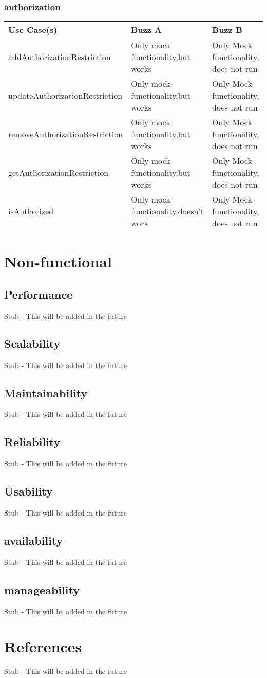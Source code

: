 \documentclass[12pt]{article}
\begin{document}
\subsubsection{authorization}%
\begin{tabular}{|l|l|l|}

\hline
Use Case(s) & Buzz A & Buzz B \\ 
\hline
addAuthorizationRestriction & Only mock functionality,but works & Only Mock functionality, does not run\\ %
\hline
updateAuthorizationRestriction & Only mock functionality,but works & Only Mock functionality, does not run\\ %
\hline
removeAuthorizationRestriction & Only mock functionality,but works & Only Mock functionality, does not run\\ %
\hline
getAuthorizationRestriction & Only mock functionality,but works & Only Mock functionality, does not run\\ %
\hline
isAuthorized & Only mock functionality,doesn't work & Only Mock functionality, does not run\\ %


\end{tabular}
\section{Non-functional} %
\subsection{Performance}
Stub - This will be added in the future
\subsection{Scalability}
Stub - This will be added in the future
\subsection{Maintainability}
Stub - This will be added in the future
\subsection{Reliability}
Stub - This will be added in the future
\subsection{Usability}
Stub - This will be added in the future
\subsection{availability}
Stub - This will be added in the future
\subsection{manageability}
Stub - This will be added in the future

\section{References}
Stub - This will be added in the future
\end{document}
